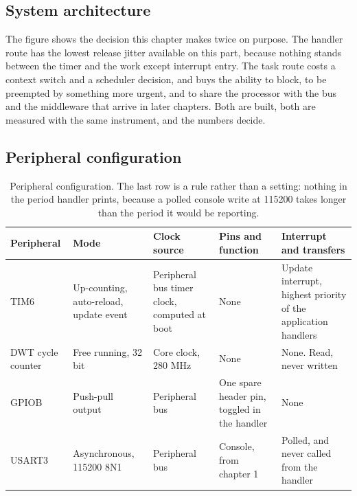 \subsection*{System architecture}


The figure shows the decision this chapter makes twice on purpose. The handler
route has the lowest release jitter available on this part, because nothing
stands between the timer and the work except interrupt entry. The task route
costs a context switch and a scheduler decision, and buys the ability to block,
to be preempted by something more urgent, and to share the processor with the
bus and the middleware that arrive in later chapters. Both are built, both are
measured with the same instrument, and the numbers decide.

\subsection*{Peripheral configuration}

\begin{table}[H]\centering\small
\begin{tabular}{p{22mm}p{26mm}p{24mm}p{30mm}p{30mm}}
\toprule
Peripheral & Mode & Clock source & Pins and function & Interrupt and transfers \\
\midrule
TIM6 & Up-counting, auto-reload, update event & Peripheral bus timer clock, computed at boot & None & Update interrupt, highest priority of the application handlers \\
DWT cycle counter & Free running, 32 bit & Core clock, 280 MHz & None & None. Read, never written \\
GPIOB & Push-pull output & Peripheral bus & One spare header pin, toggled in the handler & None \\
USART3 & Asynchronous, 115200 8N1 & Peripheral bus & Console, from chapter 1 & Polled, and never called from the handler \\
\bottomrule
\end{tabular}
\caption{Peripheral configuration. The last row is a rule rather than a setting: nothing in the period handler prints, because a polled console write at 115200 takes longer than the period it would be reporting.}
\end{table}

